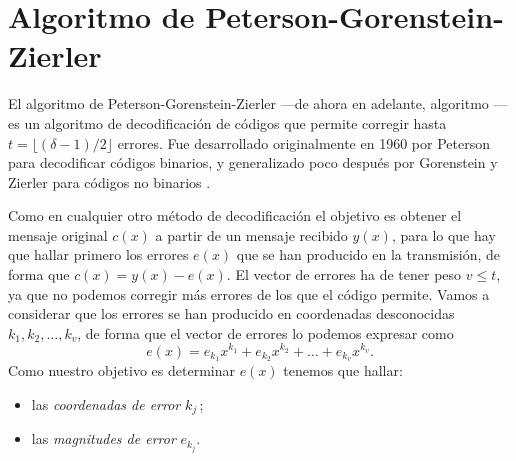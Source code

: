 \section{Algoritmo de Peterson-Gorenstein-Zierler}

El algoritmo de Peterson-Gorenstein-Zierler —de ahora en adelante, algoritmo — es un algoritmo de decodificación de códigos  que permite corregir hasta \(t = \lfloor (\delta - 1)/2 \rfloor\) errores.
Fue desarrollado originalmente en 1960 por Peterson \parencite{peterson_encoding_1960} para decodificar códigos  binarios, y generalizado poco después por Gorenstein y Zierler para códigos no binarios \parencite{gorenstein_class_1961}.

Como en cualquier otro método de decodificación el objetivo es obtener el mensaje original \(c(x)\) a partir de un mensaje recibido \(y(x)\), para lo que hay que hallar primero los errores \(e(x)\) que se han producido en la transmisión, de forma que \(c(x) = y(x) - e(x)\).
El vector de errores ha de tener peso \(v \leq t\), ya que no podemos corregir más errores de los que el código permite.
Vamos a considerar que los errores se han producido en coordenadas desconocidas \(k_1, k_2, \dots, k_v\), de forma que el vector de errores lo podemos expresar como
\[
  e(x) = e_{k_1}x^{k_1} + e_{k_2}x^{k_2} + \dots + e_{k_v}x^{k_v}.
\]
Como nuestro objetivo es determinar \(e(x)\) tenemos que hallar: \begin{itemize}
  \item las \textit{coordenadas de error} \(k_j\)\,;
  \item las \textit{magnitudes de error} \(e_{k_j}\).
\end{itemize}

